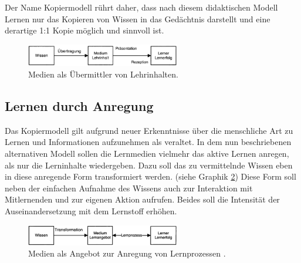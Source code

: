 Der Name Kopiermodell rührt daher, dass nach diesem didaktischen Modell Lernen nur das Kopieren von Wissen in das Gedächtnis darstellt und eine derartige 1:1 Kopie möglich und sinnvoll ist. \cite[S. 145 - 146]{Kerres.2001}

\begin{figure}[h]
	\centering
	\includegraphics[width=0.6\textwidth]{Abbildungen/Kerres2001_Kopiermodell.PNG}
	\caption{Medien als Übermittler von Lehrinhalten. \cite[S. 146]{Kerres.2001}}
	\label{fig:Kerres2001_Kopiermodell}
\end{figure}

\subsection{Lernen durch Anregung}
\label{sub:LernenDurchAnregung}
Das Kopiermodell gilt aufgrund neuer Erkenntnisse über die menschliche Art zu Lernen und Informationen aufzunehmen als veraltet.
In dem nun beschriebenen alternativen Modell sollen die Lernmedien vielmehr das aktive Lernen anregen, als nur die Lerninhalte wiedergeben. 
Dazu soll das zu vermittelnde Wissen eben in diese anregende Form transformiert werden. (siehe Graphik \ref{fig:Kerres2001_LernenDurchAnregung}) Diese Form soll neben der einfachen Aufnahme des Wissens auch zur Interaktion mit Mitlernenden und zur eigenen Aktion aufrufen. Beides soll die Intensität der Auseinandersetzung mit dem Lernstoff erhöhen. \cite[S. 147 - 148]{Kerres.2001}
\begin{figure}[h]
	\centering
	\includegraphics[width=0.6\textwidth]{Abbildungen/Kerres2001_LernenDurchAnregung.PNG}
	\caption{Medien als Angebot zur Anregung von Lernprozessen . \cite[S. 147]{Kerres.2001}}
	\label{fig:Kerres2001_LernenDurchAnregung}
\end{figure}